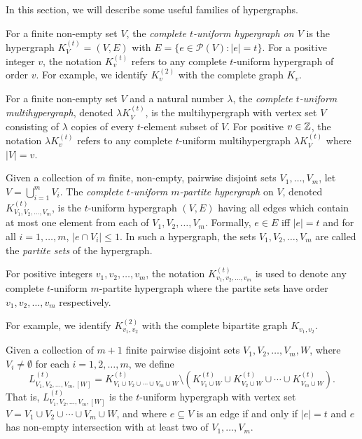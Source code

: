 In this section, we will describe some useful families of hypergraphs.

For a finite non-empty set $V$, the {\em complete $t$-uniform hypergraph on $V$}
is the hypergraph $K_V^{(t)} = (V, E)$ with $E = \{e \in \mathcal{P}(V) : |e| = t\}$.
For a positive integer $v$, the notation $K_v^{(t)}$ refers to any complete
$t$-uniform hypergraph of order $v$.
For example, we identify $K_v^{(2)}$ with the complete graph $K_v$.

For a finite non-empty set $V$ and a natural number $\lambda$, the {\em complete
$t$-uniform multihypergraph}, denoted $\lambda K_{V}^{(t)}$, is the
multihypergraph with vertex set $V$ consisting of $\lambda$ copies of every $t$-element subset
of $V$. For positive $v \in \mathbb{Z}$, the notation $\lambda K_{v}^{(t)}$ refers to
any complete $t$-uniform multihypergraph $\lambda K_{V}^{(t)}$ where $|V| = v$.

Given a collection of $m$ finite, non-empty, pairwise disjoint sets
$V_1, \ldots, V_m$, let $V = \bigcup_{i=1}^{m} V_i$.
The {\em complete $t$-uniform $m$-partite hypergraph} on $V$, denoted
$K_{V_1, V_2, \ldots, V_m}^{(t)}$, is the $t$-uniform hypergraph $(V, E)$ having
all edges which contain at most one element from each of $V_1, V_2, \ldots, V_m$.
Formally, $e \in E$ iff $|e| = t$ and for all $i=1,\ldots,m$, $|e \cap V_i| \leq 1$.
In such a hypergraph, the sets $V_1, V_2, \ldots, V_m$ are called the
{\em partite sets} of the hypergraph.

For positive integers $v_1, v_2, \ldots, v_m$, the notation $K_{v_1, v_2,
\ldots, v_m}^{(t)}$ is used to denote any complete $t$-uniform $m$-partite
hypergraph where the partite sets have order $v_1, v_2, \ldots, v_m$
respectively.

For example, we identify $K_{v_1, v_2}^{(2)}$ with the complete bipartite graph
$K_{v_1,v_2}$.

Given a collection of $m+1$ finite pairwise disjoint sets
$V_1, V_2, \ldots, V_m, W$, where $V_i \neq \emptyset$ for each $i = 1, 2, \ldots, m$, we define
\[
    L_{V_1, V_2, \ldots, V_m, [W]}^{(t)} = K_{V_1 \cup V_2 \cup \cdots \cup V_m \cup W}^{(t)} \setminus (K_{V_1 \cup W}^{(t)} \cup K_{V_2 \cup W}^{(t)} \cup \cdots \cup K_{V_m \cup W}^{(t)}).
\]
That is, $L_{V_1, V_2, \ldots, V_m, [W]}^{(t)}$ is the $t$-uniform hypergraph with vertex set $V = V_1 \cup V_2 \cup \cdots \cup V_m \cup W$, and where $e \subseteq V$ is an edge if and only if $|e| = t$ and $e$ has non-empty intersection with at least two of $V_1, \ldots, V_m$.

